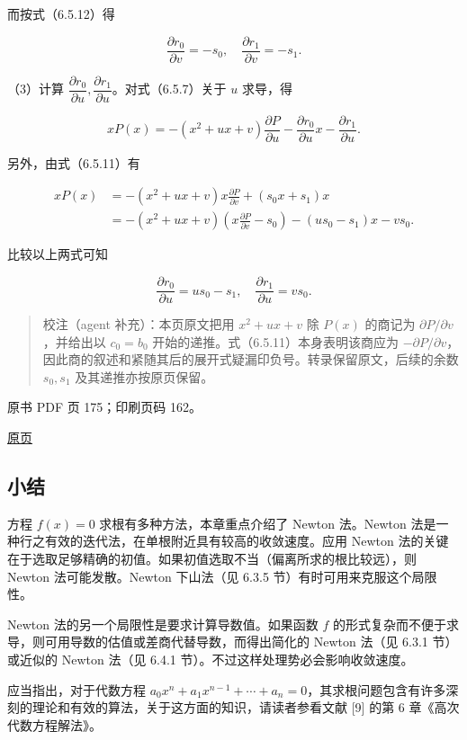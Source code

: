 而按式（6.5.12）得

\[
\frac{\partial r_0}{\partial v}=-s_0,\quad\frac{\partial r_1}{\partial v}=-s_1.
\]

（3）计算 \(\dfrac{\partial r_0}{\partial u},\dfrac{\partial r_1}{\partial u}\)。对式（6.5.7）关于 \(u\) 求导，得

\[
xP(x)=-(x^2+ux+v)\frac{\partial P}{\partial u}-\frac{\partial r_0}{\partial u}x-\frac{\partial r_1}{\partial u}.
\]

另外，由式（6.5.11）有

\[
\begin{aligned}
xP(x)&=-(x^2+ux+v)x\frac{\partial P}{\partial v}+(s_0x+s_1)x\\
&=-(x^2+ux+v)\left(x\frac{\partial P}{\partial v}-s_0\right)-(us_0-s_1)x-vs_0.
\end{aligned}
\]

比较以上两式可知

\[
\frac{\partial r_0}{\partial u}=us_0-s_1,\quad\frac{\partial r_1}{\partial u}=vs_0.
\]

\begin{quote}
校注（agent 补充）：本页原文把用 \(x^2+ux+v\) 除 \(P(x)\) 的商记为 \(\partial P/\partial v\)，并给出以 \(c_0=b_0\) 开始的递推。式（6.5.11）本身表明该商应为 \(-\partial P/\partial v\)，因此商的叙述和紧随其后的展开式疑漏印负号。转录保留原文，后续的余数 \(s_0,s_1\) 及其递推亦按原页保留。
\end{quote}

\clearpage

原书 PDF 页 175；印刷页码 162。

\href{source-images/pdf-175.jpeg}{原页}

\subsection{小结}\label{ch06-ux5c0fux7ed3}

方程 \(f(x)=0\) 求根有多种方法，本章重点介绍了 Newton 法。Newton 法是一种行之有效的迭代法，在单根附近具有较高的收敛速度。应用 Newton 法的关键在于选取足够精确的初值。如果初值选取不当（偏离所求的根比较远），则 Newton 法可能发散。Newton 下山法（见 6.3.5 节）有时可用来克服这个局限性。

Newton 法的另一个局限性是要求计算导数值。如果函数 \(f\) 的形式复杂而不便于求导，则可用导数的估值或差商代替导数，而得出简化的 Newton 法（见 6.3.1 节）或近似的 Newton 法（见 6.4.1 节）。不过这样处理势必会影响收敛速度。

应当指出，对于代数方程 \(a_0x^n+a_1x^{n-1}+\cdots+a_n=0\)，其求根问题包含有许多深刻的理论和有效的算法，关于这方面的知识，请读者参看文献 {[}9{]} 的第 6 章《高次代数方程解法》。

